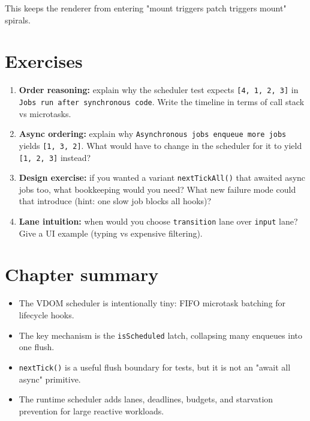 This keeps the renderer from entering "mount triggers patch triggers mount" spirals.

\section{Exercises}

\begin{enumerate}
  \item \textbf{Order reasoning:} explain why the scheduler test expects \texttt{[4, 1, 2, 3]} in
      \texttt{Jobs run after synchronous code}. Write the timeline in terms of call stack vs microtasks.

  \item \textbf{Async ordering:} explain why \texttt{Asynchronous jobs enqueue more jobs} yields \texttt{[1, 3, 2]}.
    What would have to change in the scheduler for it to yield \texttt{[1, 2, 3]} instead?

  \item \textbf{Design exercise:} if you wanted a variant \texttt{nextTickAll()} that awaited async jobs too,
    what bookkeeping would you need? What new failure mode could that introduce (hint: one slow job blocks all hooks)?

  \item \textbf{Lane intuition:} when would you choose \texttt{transition} lane over \texttt{input} lane?
    Give a UI example (typing vs expensive filtering).
\end{enumerate}

\section{Chapter summary}

\begin{itemize}
  \item The VDOM scheduler is intentionally tiny: FIFO microtask batching for lifecycle hooks.
  \item The key mechanism is the \texttt{isScheduled} latch, collapsing many enqueues into one flush.
  \item \texttt{nextTick()} is a useful flush boundary for tests, but it is not an "await all async" primitive.
  \item The runtime scheduler adds lanes, deadlines, budgets, and starvation prevention for large reactive workloads.
\end{itemize}
